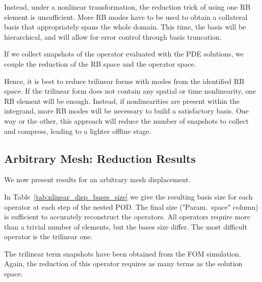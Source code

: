 \documentclass[../../thesis.tex]{subfiles}
\begin{document}
Instead, under a nonlinear transformation,
the reduction trick of using one RB element is unsufficient.
More RB modes have to be used to obtain a collateral basis that appropriately spans the whole domain.
This time, the basis will be hierarchical, 
and will allow for error control through basis truncation.

If we collect snapshots of the operator evaluated with the PDE solutions,
we couple the reduction of the RB space and the operator space.

Hence, it is best to reduce trilinear forms with modes from the identified RB space.
If the trilinear form does not contain any spatial or time nonlinearity, 
one RB element will be enough.
Instead, if nonlinearities are present within the integrand, more RB modes will be necessary 
to build a satisfactory basis.
One way or the other, this approach will reduce the number of snapshots to collect and compress,
leading to a lighter offline stage.

\clearpage
\subsection{Arbitrary Mesh: Reduction Results}
\label{sec:arbitrary_mesh_results}
We now present results for an arbitrary mesh displacement. 

In Table~\ref{tab:nlinear_disp_bases_size} we give the resulting basis size 
for each operator at each step of the nested POD.
The final size (\mbox{"Param. space"} column) is sufficient to accurately reconstruct the operators.
All operators require more than a trivial number of elements, 
but the bases size differ.
The most difficult operator is the trilinear one.

The trilinear term snapshots have been obtained from the FOM simulation.
Again, the reduction of this operator requires as many terms as the solution space.
\end{document}
